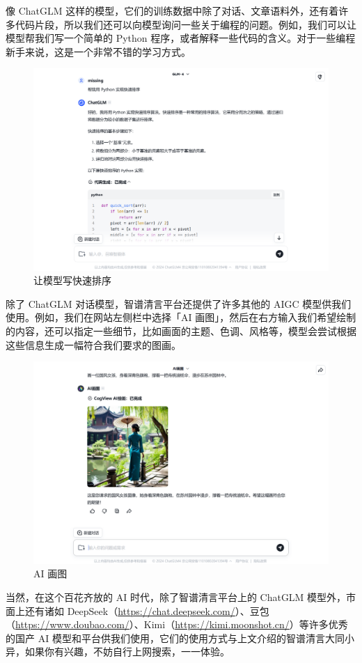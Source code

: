 像 ChatGLM 这样的模型，它们的训练数据中除了对话、文章语料外，还有着许多代码片段，所以我们还可以向模型询问一些关于编程的问题。例如，我们可以让模型帮我们写一个简单的 Python 程序，或者解释一些代码的含义。对于一些编程新手来说，这是一个非常不错的学习方式。

\begin{figure}[htb!]
  \centering
  \includegraphics[width=.75\textwidth]{assets/surpass/Zhipu_q8.png}
  \caption{让模型写快速排序}
  \label{fig:Zhipu_q8}
\end{figure}

除了 ChatGLM 对话模型，智谱清言平台还提供了许多其他的 AIGC 模型供我们使用。例如，我们在网站左侧栏中选择「AI 画图」，然后在右方输入我们希望绘制的内容，还可以指定一些细节，比如画面的主题、色调、风格等，模型会尝试根据这些信息生成一幅符合我们要求的图画。

\begin{figure}[htb!]
  \centering
  \includegraphics[width=.75\textwidth]{assets/surpass/Zhipu_q7.png}
  \caption{AI 画图}
  \label{fig:Zhipu_q7}
\end{figure}

当然，在这个百花齐放的 AI 时代，除了智谱清言平台上的 ChatGLM 模型外，市面上还有诸如 DeepSeek（\url{https://chat.deepseek.com/}）、豆包（\url{https://www.doubao.com/}）、Kimi（\url{https://kimi.moonshot.cn/}）等许多优秀的国产 AI 模型和平台供我们使用，它们的使用方式与上文介绍的智谱清言大同小异，如果你有兴趣，不妨自行上网搜索，一一体验。


